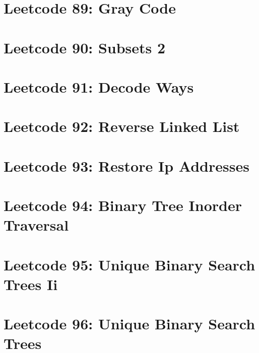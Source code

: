 \documentclass{article}
\begin{document}
\section*{Leetcode 89: Gray Code}

\pagebreak 

\section*{Leetcode 90: Subsets 2}

\pagebreak 

\section*{Leetcode 91: Decode Ways}

\pagebreak 

\section*{Leetcode 92: Reverse Linked List}

\pagebreak 

\section*{Leetcode 93: Restore Ip Addresses}

\pagebreak 

\section*{Leetcode 94: Binary Tree Inorder Traversal}

\pagebreak 

\section*{Leetcode 95: Unique Binary Search Trees Ii}

\pagebreak 

\section*{Leetcode 96: Unique Binary Search Trees}

\pagebreak 
\end{document}
